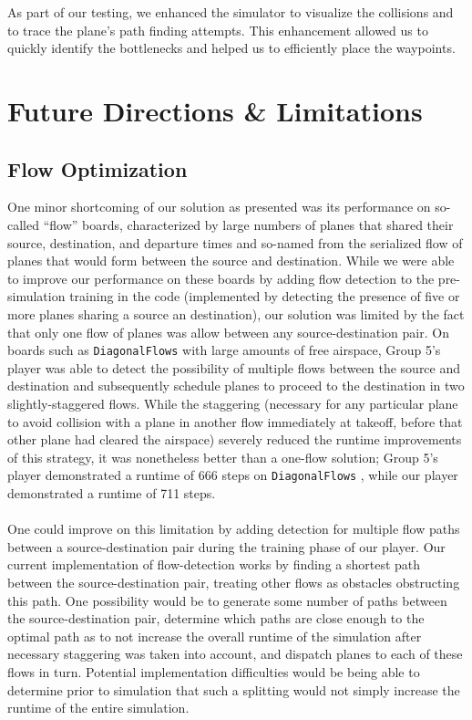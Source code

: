 \documentclass[10pt]{article}
\newcommand{\ms}[1] {
  \texttt{#1}
}
\begin{document}
As part of our testing, we enhanced the simulator to visualize the collisions
and to trace the plane's path finding attempts. This enhancement allowed us to
quickly identify the bottlenecks and helped us to efficiently place the
waypoints.

\newpage
\section{Future Directions \& Limitations}

\subsection{Flow Optimization}

One minor shortcoming of our solution as presented was its performance 
on so-called ``flow'' boards, characterized by large numbers  of planes that shared 
their source, destination, and departure times and so-named from the serialized 
flow of planes that would form between the source and destination.  While we
were able to improve our performance on these boards by adding flow detection
to the pre-simulation training in the code (implemented by detecting the presence
of five or more planes sharing a source an destination), our solution was limited
by the fact that only one flow of planes was allow between any source-destination
pair. On boards such as \ms{DiagonalFlows} with large amounts of free airspace, Group 5's
player was able to detect the possibility of multiple flows between the source and destination
and subsequently schedule planes to proceed to the destination in two slightly-staggered
flows. While the staggering (necessary for any particular plane to avoid collision with
a plane in another flow immediately at takeoff, before that other plane had cleared the 
airspace) severely reduced the runtime improvements of this strategy, it was nonetheless
better than a one-flow solution; Group 5's player demonstrated a runtime of 666 steps
on \ms{DiagonalFlows}, while our player demonstrated a runtime of 711 steps.\\\\
One could improve on this limitation by adding detection for multiple flow paths between
a source-destination pair during the training phase of our player. Our current implementation
of flow-detection works by finding a shortest path between the source-destination pair, treating
other flows as obstacles obstructing this path. One possibility would be to generate some number
of paths between the source-destination pair, determine which paths are close enough to the
optimal path as to not increase the overall runtime of the simulation after necessary 
staggering was taken into account, and dispatch planes to each of these flows in turn.
Potential implementation difficulties would be being able to determine prior to simulation
that such a splitting would not simply increase the runtime of the entire simulation.
\end{document}
